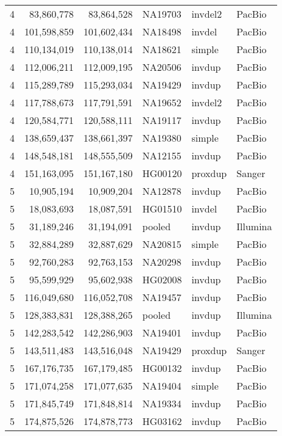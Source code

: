{\begin{longtable}{rrrlll}
    4   & 83,860,778  & 83,864,528  & NA19703 & invdel2 & PacBio  \\
    4   & 101,598,859 & 101,602,434 & NA18498 & invdel  & PacBio  \\
    4   & 110,134,019 & 110,138,014 & NA18621 & simple  & PacBio  \\
    4   & 112,006,211 & 112,009,195 & NA20506 & invdup  & PacBio  \\
    4   & 115,289,789 & 115,293,034 & NA19429 & invdup  & PacBio  \\
    4   & 117,788,673 & 117,791,591 & NA19652 & invdel2 & PacBio  \\
    4   & 120,584,771 & 120,588,111 & NA19117 & invdup  & PacBio  \\
    4   & 138,659,437 & 138,661,397 & NA19380 & simple  & PacBio  \\
    4   & 148,548,181 & 148,555,509 & NA12155 & invdup  & PacBio  \\
    4   & 151,163,095 & 151,167,180 & HG00120 & proxdup & Sanger  \\
    5   & 10,905,194  & 10,909,204  & NA12878 & invdup  & PacBio  \\
    5   & 18,083,693  & 18,087,591  & HG01510 & invdel  & PacBio  \\
    5   & 31,189,246  & 31,194,091  & pooled  & invdup  & Illumina  \\
    5   & 32,884,289  & 32,887,629  & NA20815 & simple  & PacBio  \\
    5   & 92,760,283  & 92,763,153  & NA20298 & invdup  & PacBio  \\
    5   & 95,599,929  & 95,602,938  & HG02008 & invdup  & PacBio  \\
    5   & 116,049,680 & 116,052,708 & NA19457 & invdup  & PacBio  \\
    5   & 128,383,831 & 128,388,265 & pooled  & invdup  & Illumina  \\
    5   & 142,283,542 & 142,286,903 & NA19401 & invdup  & PacBio  \\
    5   & 143,511,483 & 143,516,048 & NA19429 & proxdup & Sanger  \\
    5   & 167,176,735 & 167,179,485 & HG00132 & invdup  & PacBio  \\
    5   & 171,074,258 & 171,077,635 & NA19404 & simple  & PacBio  \\
    5   & 171,845,749 & 171,848,814 & NA19334 & invdup  & PacBio  \\
    5   & 174,875,526 & 174,878,773 & HG03162 & invdup  & PacBio  \\

\end{longtable}}
